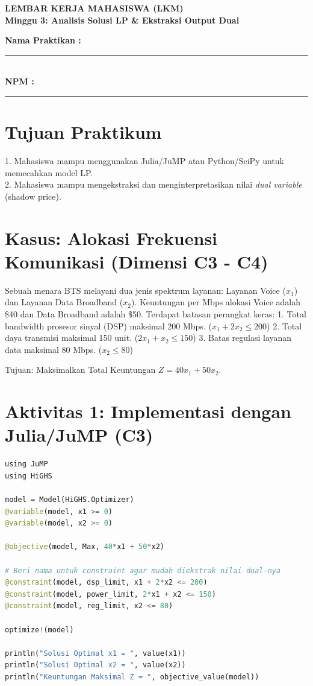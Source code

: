 \documentclass[11pt, a4paper]{article}
\begin{document}
\begin{center}
    \Large\color{UNIBBlue}\textbf{LEMBAR KERJA MAHASISWA (LKM)}\\
    \large\textbf{Minggu 3: Analisis Solusi LP \& Ekstraksi Output Dual}
\end{center}

\vspace{0.5cm}
\textbf{Nama Praktikan :} \rule{6cm}{0.4pt} \\
\textbf{NPM :} \rule{6.8cm}{0.4pt}

\section*{Tujuan Praktikum}
1. Mahasiswa mampu menggunakan Julia/JuMP atau Python/SciPy untuk memecahkan model LP. \\
2. Mahasiswa mampu mengekstraksi dan menginterpretasikan nilai \textit{dual variable} (shadow price).

\section*{Kasus: Alokasi Frekuensi Komunikasi (Dimensi C3 - C4)}
Sebuah menara BTS melayani dua jenis spektrum layanan: Layanan Voice ($x_1$) dan Layanan Data Broadband ($x_2$). Keuntungan per Mbps alokasi Voice adalah \$40 dan Data Broadband adalah \$50.
Terdapat batasan perangkat keras:
1. Total bandwidth prosesor sinyal (DSP) maksimal 200 Mbps. ($x_1 + 2x_2 \le 200$)
2. Total daya transmisi maksimal 150 unit. ($2x_1 + x_2 \le 150$)
3. Batas regulasi layanan data maksimal 80 Mbps. ($x_2 \le 80$)

Tujuan: Maksimalkan Total Keuntungan $Z = 40x_1 + 50x_2$.

\section*{Aktivitas 1: Implementasi dengan Julia/JuMP (C3)}
\begin{lstlisting}[language=Python]
using JuMP
using HiGHS

model = Model(HiGHS.Optimizer)
@variable(model, x1 >= 0)
@variable(model, x2 >= 0)

@objective(model, Max, 40*x1 + 50*x2)

# Beri nama untuk constraint agar mudah diekstrak nilai dual-nya
@constraint(model, dsp_limit, x1 + 2*x2 <= 200)
@constraint(model, power_limit, 2*x1 + x2 <= 150)
@constraint(model, reg_limit, x2 <= 80)

optimize!(model)

println("Solusi Optimal x1 = ", value(x1))
println("Solusi Optimal x2 = ", value(x2))
println("Keuntungan Maksimal Z = ", objective_value(model))
\end{lstlisting}
\end{document}
